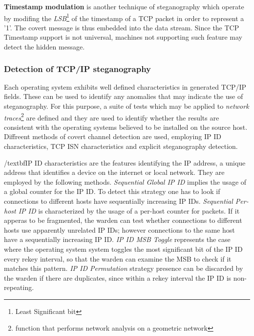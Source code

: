 \documentclass[../../main.tex]{subfiles}
\begin{document}
    \textbf{Timestamp modulation} is another technique of steganography which
    operate by modifing the \emph{LSB}\footnote{Least Significant bit} of the
    timestamp of a TCP packet in order to represent a '1'.
    The covert message is thus embedded into the data stream.
    Since the TCP Timestamp support is not universal, machines not supporting
    such feature may detect the hidden message.


    \subsubsection{Detection of TCP/IP steganography}

    Each operating system exhibits well defined characteristics in generated
    TCP/IP fields. These can be used to identify any anomalies that may indicate 
    the use of steganography. For this purpose, a suite of tests which may be
    applied to \emph{network traces}\footnote{function that performs network analysis
    on a geometric network} are defined and they are used to identify whether 
    the results are consistent with the operating systems believed to be installed
    on the source host.
    Diffreent methods of covert channel detection are used, employing IP ID 
    characteristics, TCP ISN characteristics and explicit steganography detection.

    /textbf{IP ID characteristics} are the features identifying the IP address, a 
    unique address that identifies a device on the internet or local network. They are 
    employed by the following methods.
    \emph{Sequential Global IP ID} implies the usage of a global counter for the IP ID. 
    To detect this strategy one has to look if connections to different hosts have 
    sequentially increasing IP IDs.
    \emph{Sequential Per-host IP ID} is characterized by the usage of a per-host counter 
    for packets. If it apperas to be fragmented, the warden can test whether connections 
    to different hosts use apparently unrelated IP IDs; however connections to the same 
    host have a sequentially increasing IP ID.
    \emph{IP ID MSB Toggle} represents the case where the operating system system toggles 
    the most significant bit of the IP ID every rekey interval, so that the warden can 
    examine the MSB to check if it matches this pattern.
    \emph{IP ID Permutation} strategy presence can be discarded by the warden if there are 
    duplicates, since within a rekey interval the IP ID is non-repeating.
\end{document}
